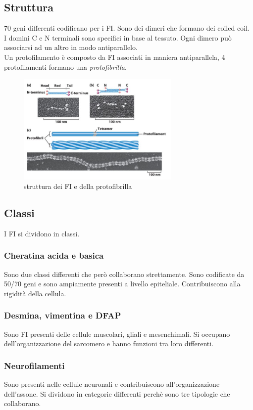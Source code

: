     \subsection{Struttura}
        70 geni differenti codificano per i FI. Sono dei dimeri che formano dei coiled coil. I domini C e N terminali sono specifici in base al tessuto. Ogni dimero può associarsi ad un altro in modo antiparallelo.   \\
        Un protofilamento è composto da FI associati in maniera antiparallela, 4 protofilamenti formano una \textit{protofibrilla}.
        \begin{figure}[h]
            \centering
            \includegraphics[width=0.7\textwidth]{images/filametiIntermedi.JPG}
            \caption{\small struttura dei FI e della protofibrilla}
            \label{fig:mesh1}
        \end{figure}
    \subsection{Classi}
        I FI si dividono in classi.
        \subsubsection{Cheratina acida e basica}
            Sono due classi differenti che però collaborano strettamente. Sono codificate da 50/70 geni e sono ampiamente presenti a livello epiteliale. Contribuiscono alla rigidità della cellula.
        \subsubsection{Desmina, vimentina e DFAP}
            Sono FI presenti delle cellule muscolari, gliali e mesenchimali. Si occupano dell'organizzazione del sarcomero e hanno funzioni tra loro differenti.
        \subsubsection{Neurofilamenti}
            Sono presenti nelle cellule neuronali e contribuiscono all'organizzazione dell'assone. Si dividono in categorie differenti perchè sono tre tipologie che collaborano.
